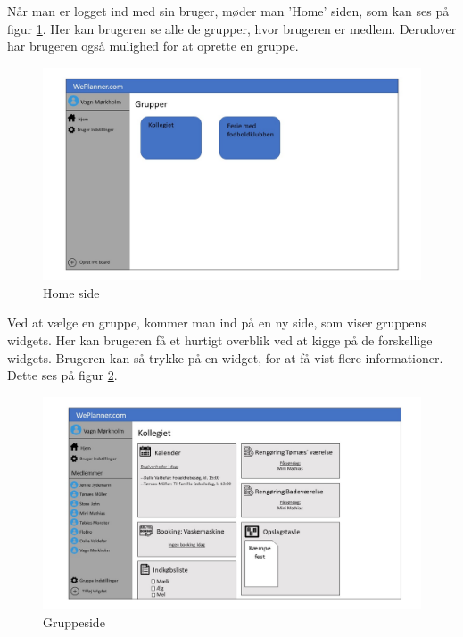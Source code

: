 \noindent Når man er logget ind med sin bruger, møder man 'Home' siden, som kan ses på figur \ref{fig:home_site}. Her kan brugeren se alle de grupper, hvor brugeren er medlem. Derudover har brugeren også mulighed for at oprette en gruppe.
\begin{figure}[H]
  \includegraphics[width=\linewidth]{01_Billeder/04_Indledning/Slide2.JPG}
  \centering
  \caption{Home side}
  \label{fig:home_site}
\end{figure}

\noindent Ved at vælge en gruppe, kommer man ind på en ny side, som viser gruppens widgets. Her kan brugeren få et hurtigt overblik ved at kigge på de forskellige widgets. Brugeren kan så trykke på en widget, for at få vist flere informationer. Dette ses på figur \ref{fig:board_site}.
\begin{figure}[H]
  \includegraphics[width=\linewidth]{01_Billeder/04_Indledning/Slide3.JPG}
  \centering
  \caption{Gruppeside}
  \label{fig:board_site}
\end{figure}

